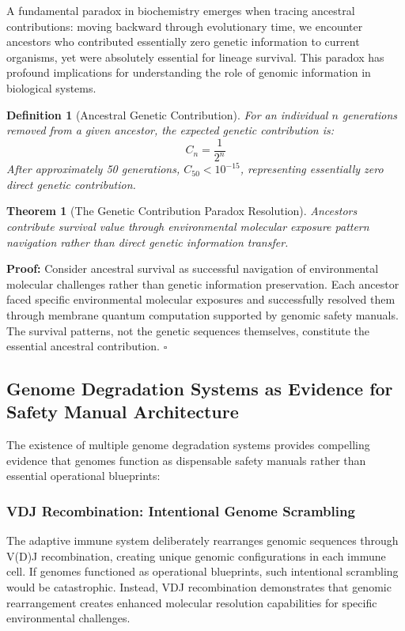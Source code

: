 \documentclass[12pt,a4paper]{article}
\newtheorem{theorem}{Theorem}
\newtheorem{definition}{Definition}
\begin{document}
A fundamental paradox in biochemistry emerges when tracing ancestral contributions: moving backward through evolutionary time, we encounter ancestors who contributed essentially zero genetic information to current organisms, yet were absolutely essential for lineage survival. This paradox has profound implications for understanding the role of genomic information in biological systems.

\begin{definition}[Ancestral Genetic Contribution]
For an individual $n$ generations removed from a given ancestor, the expected genetic contribution is:
\begin{equation}
C_n = \frac{1}{2^n}
\end{equation}
After approximately 50 generations, $C_{50} < 10^{-15}$, representing essentially zero direct genetic contribution.
\end{definition}

\begin{theorem}[The Genetic Contribution Paradox Resolution]
Ancestors contribute survival value through environmental molecular exposure pattern navigation rather than direct genetic information transfer.
\end{theorem}

\textbf{Proof:} Consider ancestral survival as successful navigation of environmental molecular challenges rather than genetic information preservation. Each ancestor faced specific environmental molecular exposures and successfully resolved them through membrane quantum computation supported by genomic safety manuals. The survival patterns, not the genetic sequences themselves, constitute the essential ancestral contribution. $\square$

\subsection{Genome Degradation Systems as Evidence for Safety Manual Architecture}

The existence of multiple genome degradation systems provides compelling evidence that genomes function as dispensable safety manuals rather than essential operational blueprints:

\subsubsection{VDJ Recombination: Intentional Genome Scrambling}

The adaptive immune system deliberately rearranges genomic sequences through V(D)J recombination, creating unique genomic configurations in each immune cell. If genomes functioned as operational blueprints, such intentional scrambling would be catastrophic. Instead, VDJ recombination demonstrates that genomic rearrangement creates enhanced molecular resolution capabilities for specific environmental challenges.
\end{document}
